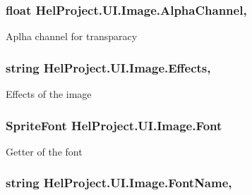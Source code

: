 \subsubsection[{Alpha\+Channel}]{\setlength{\rightskip}{0pt plus 5cm}float Hel\+Project.\+U\+I.\+Image.\+Alpha\+Channel\hspace{0.3cm}{\ttfamily [get]}, {\ttfamily [set]}}\label{class_hel_project_1_1_u_i_1_1_image_a88c8f934be50346b0c1fcdb125c5f3ce}


Aplha channel for transparacy 

\hypertarget{class_hel_project_1_1_u_i_1_1_image_a0dbd14214284f081dda6ca93590bede8}{}
\subsubsection[{Effects}]{\setlength{\rightskip}{0pt plus 5cm}string Hel\+Project.\+U\+I.\+Image.\+Effects\hspace{0.3cm}{\ttfamily [get]}, {\ttfamily [set]}}\label{class_hel_project_1_1_u_i_1_1_image_a0dbd14214284f081dda6ca93590bede8}


Effects of the image 

\hypertarget{class_hel_project_1_1_u_i_1_1_image_a6e25ee935e6d96933d122abe14980378}{}
\subsubsection[{Font}]{\setlength{\rightskip}{0pt plus 5cm}Sprite\+Font Hel\+Project.\+U\+I.\+Image.\+Font\hspace{0.3cm}{\ttfamily [get]}}\label{class_hel_project_1_1_u_i_1_1_image_a6e25ee935e6d96933d122abe14980378}


Getter of the font 

\hypertarget{class_hel_project_1_1_u_i_1_1_image_ae5b5c6f2347963176eff641b8a725485}{}
\subsubsection[{Font\+Name}]{\setlength{\rightskip}{0pt plus 5cm}string Hel\+Project.\+U\+I.\+Image.\+Font\+Name\hspace{0.3cm}{\ttfamily [get]}, {\ttfamily [set]}}\label{class_hel_project_1_1_u_i_1_1_image_ae5b5c6f2347963176eff641b8a725485}


